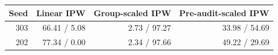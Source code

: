 \begin{tabular}{rrrr}
\toprule
Seed & Linear IPW & Group-scaled IPW & Pre-audit-scaled IPW \\
\midrule
303 & 66.41 / 5.08 & 2.73 / 97.27 & 33.98 / 54.69 \\
202 & 77.34 / 0.00 & 2.34 / 97.66 & 49.22 / 29.69 \\
\bottomrule
\end{tabular}
